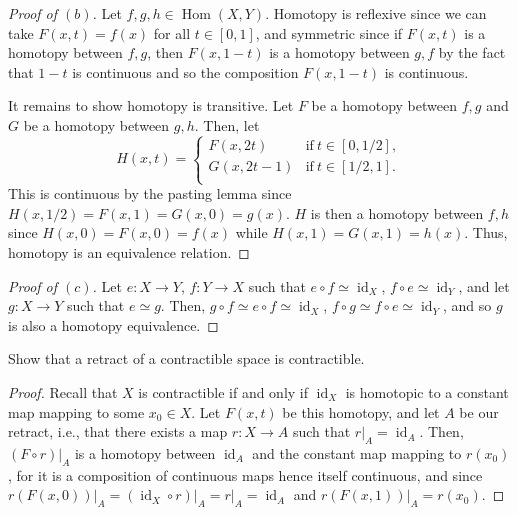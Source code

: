 \documentclass[12pt]{article}
\theoremstyle{remark}
\DeclareMathOperator{\id}{id}
\DeclareMathOperator{\Hom}{Hom}
\begin{document}
\begin{proof}[Proof of $(b)$]
  Let $f,g,h \in \Hom(X,Y)$. Homotopy is reflexive since we can take $F(x,t) = f(x)$ for all $t \in [0,1]$, and symmetric since if $F(x,t)$ is a homotopy between $f,g$, then $F(x,1-t)$ is a homotopy between $g,f$ by the fact that $1-t$ is continuous and so the composition $F(x,1-t)$ is continuous.
  \par It remains to show homotopy is transitive. Let $F$ be a homotopy between $f,g$ and $G$ be a homotopy between $g,h$. Then, let
  \begin{equation*}
    H(x,t) = \begin{cases}
      F(x,2t) & \text{if}~t \in [0,1/2],\\
      G(x,2t-1) & \text{if}~t \in [1/2,1].\\
    \end{cases}
  \end{equation*}
  This is continuous by the pasting lemma since $H(x,1/2) = F(x,1) = G(x,0) = g(x)$. $H$ is then a homotopy between $f,h$ since $H(x,0) = F(x,0) = f(x)$ while $H(x,1) = G(x,1) = h(x)$. Thus, homotopy is an equivalence relation.
\end{proof}
\begin{proof}[Proof of $(c)$]
  Let $e\colon X \to Y$, $f\colon Y \to X$ such that $e \circ f \simeq \id_X$, $f \circ e \simeq \id_Y$, and let $g\colon X \to Y$ such that $e \simeq g$. Then, $g \circ f \simeq e \circ f \simeq \id_X$, $f \circ g \simeq f \circ e \simeq \id_Y$, and so $g$ is also a homotopy equivalence.
\end{proof}

\setcounter{subsubsection}{8}
\begin{problem}
  Show that a retract of a contractible space is contractible.
\end{problem}
\begin{proof}
  Recall that $X$ is contractible if and only if $\id_X$ is homotopic to a
  constant map mapping to some $x_0 \in X$. Let $F(x,t)$ be this homotopy, and let
  $A$ be our retract, i.e., that there exists a map $r\colon X \to A$ such that
  $r\rvert_A = \id_A$. Then, $(F \circ r)\rvert_A$ is a homotopy between $\id_A$
  and the constant map mapping to $r(x_0)$, for it is a composition of continuous
  maps hence itself continuous, and since $r(F(x,0))\rvert_A = (\id_X \circ
  r)\rvert_A = r\rvert_A = \id_A$ and $r(F(x,1))\rvert_A = r(x_0)$. 
\end{proof}
\end{document}
